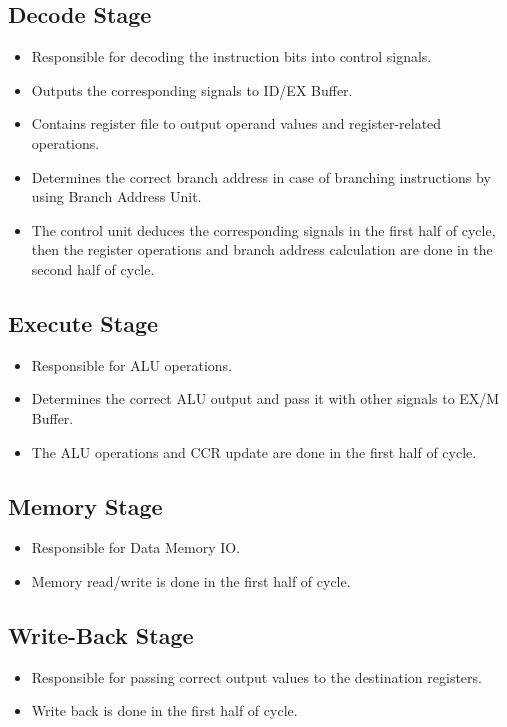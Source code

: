 \documentclass[12pt]{report}
\begin{document}
\subsection{Decode Stage}
\begin{itemize}
    \item Responsible for decoding the instruction bits into control signals.
    \item Outputs the corresponding signals to ID/EX Buffer.
    \item Contains register file to output operand values and register-related operations.
    \item Determines the correct branch address in case of branching instructions by using Branch Address Unit.
    \item The control unit deduces the corresponding signals in the first half of cycle, then the register operations and branch address calculation are done in the second half of cycle.
\end{itemize}

\subsection{Execute Stage}
\begin{itemize}
    \item Responsible for ALU operations.
    \item Determines the correct ALU output and pass it with other signals to EX/M Buffer.
    \item The ALU operations and CCR update are done in the first half of cycle.
\end{itemize}

\subsection{Memory Stage}
\begin{itemize}
    \item Responsible for Data Memory IO.
    \item Memory read/write is done in the first half of cycle.
\end{itemize}

\subsection{Write-Back Stage}
\begin{itemize}
    \item Responsible for passing correct output values to the destination registers.
    \item Write back is done in the first half of cycle.
\end{itemize}
\end{document}
